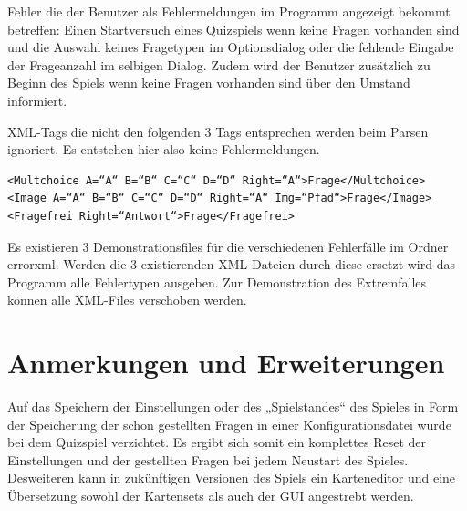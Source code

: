 \documentclass[10pt,a4paper,titlepage]{article}
\begin{document}
Fehler die der Benutzer als Fehlermeldungen im Programm angezeigt bekommt betreffen:
Einen Startversuch eines Quizspiels wenn keine Fragen vorhanden sind und die Auswahl keines Fragetypen im Optionsdialog oder die fehlende Eingabe der Frageanzahl im selbigen Dialog.
Zudem wird der Benutzer zusätzlich zu Beginn des Spiels wenn keine Fragen vorhanden sind über den Umstand informiert.

XML-Tags die nicht den folgenden 3 Tags entsprechen werden beim Parsen ignoriert.
Es entstehen hier also keine Fehlermeldungen.
\begin{lstlisting}[caption=Korrekte Tags]
<Multchoice A=“A“ B=“B“ C=“C“ D=“D“ Right=“A“>Frage</Multchoice>
<Image A=“A“ B=“B“ C=“C“ D=“D“ Right=“A“ Img=“Pfad“>Frage</Image>
<Fragefrei Right=“Antwort“>Frage</Fragefrei>
\end{lstlisting}
Es existieren 3 Demonstrationsfiles für die verschiedenen Fehlerfälle im Ordner errorxml.
Werden die 3 existierenden XML-Dateien durch diese ersetzt wird das Programm alle Fehlertypen ausgeben.
Zur Demonstration des Extremfalles können alle XML-Files verschoben werden.
\section{Anmerkungen und Erweiterungen}
Auf das Speichern der Einstellungen oder des „Spielstandes“ des Spieles in Form der Speicherung der schon gestellten Fragen in einer Konfigurationsdatei wurde bei dem Quizspiel verzichtet.
Es ergibt sich somit ein komplettes Reset der Einstellungen und der gestellten Fragen bei jedem Neustart des Spieles. Desweiteren kann in zukünftigen Versionen des Spiels ein Karteneditor und eine Übersetzung sowohl der Kartensets als auch der GUI angestrebt werden.
	
\end{document}
